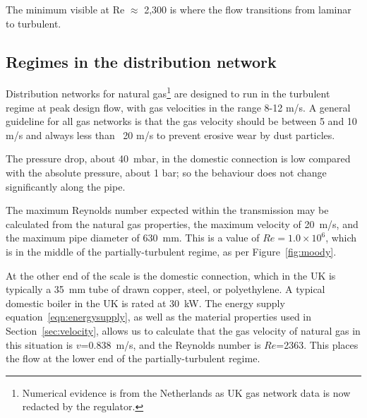 \documentclass[5p]{elsarticle} %
\begin{document}
The minimum visible  at Re $\approx$ 2,300  is where the flow transitions from laminar to turbulent\citep{Allen2007}. 



\subsection{Regimes in the distribution network }
\label{sec:service}

Distribution networks for natural gas\footnote{Numerical evidence is from the Netherlands\citep{Schouten2004} as UK gas network data is now redacted by the regulator.
} are designed to run in the turbulent regime at peak design flow, with gas velocities in the range 8-12 m/s. 
A general guideline for all gas networks is that the gas velocity should be between 5 and 10 m/s and always less than ~20 m/s to prevent erosive wear by dust particles\citep{Schouten2004,Tabkhi2008,Ejo2020, Abbas2021}.

The pressure drop, about 40~mbar, in the domestic connection is low compared with the absolute pressure, about 1 bar; so the behaviour does not change significantly along the pipe.

The maximum Reynolds number expected within the transmission may be calculated from the natural gas properties, the maximum velocity of 20~m/s, and the maximum pipe diameter of 630~mm\citep{GPS2008}.
This is a value of $Re = 1.0\times10^6$, which is in the middle of the partially-turbulent regime, as per Figure~\ref{fig:moody}.

At the other end of the scale is the domestic connection,
which in the UK is typically a 35~mm tube of drawn copper, steel, or polyethylene\citep{dodds2013}.
A typical domestic boiler in the UK is rated at 30~kW\citep{GASTEC2009, Bennett2020}.
The energy supply equation~\eqref{eqn:energysupply}, as well as the material properties used in Section~\ref{sec:velocity}, allows us to calculate that the gas velocity of natural gas in this situation is $v$=0.838~m/s, and the Reynolds number is $Re$=2363.
This places the flow at the lower end of the partially-turbulent regime.
\end{document}
